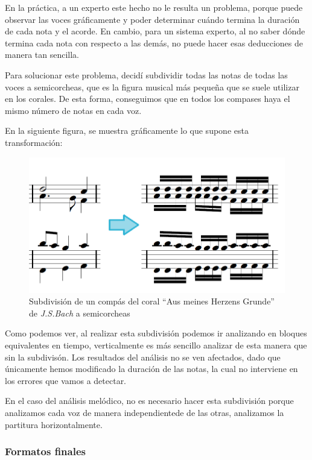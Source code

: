 En la práctica, a un experto este hecho no le resulta un problema, porque puede observar las voces gráficamente y poder determinar cuándo termina la duración de cada nota y el acorde. En cambio, para un sistema experto, al no saber dónde termina cada nota con respecto a las demás, no puede hacer esas deducciones de manera tan sencilla. 

Para solucionar este problema, decidí subdividir todas las notas de todas las voces a semicorcheas, que es la figura musical más pequeña que se suele utilizar en los corales. De esta forma, conseguimos que en todos los compases haya el mismo número de notas en cada voz.

En la siguiente figura, se muestra gráficamente lo que supone esta transformación:


\begin{figure}[H]
	\centering
	\includegraphics[scale=0.5]{imagenes/division.png}
	\caption{Subdivisión de un compás del coral ``Aus meines Herzens Grunde'' de \textit{J.S.Bach} a semicorcheas}
	\label{fig5.1.1}
\end{figure}

Como podemos ver, al realizar esta subdivisión podemos ir analizando en bloques equivalentes en tiempo, verticalmente es más sencillo analizar de esta manera que sin la subdivisón. Los resultados del análisis no se ven afectados, dado que únicamente hemos modificado la duración de las notas, la cual no interviene en los errores que vamos a detectar.

En el caso del análisis melódico, no es necesario hacer esta subdivisión porque analizamos cada voz de manera independientede de las otras, analizamos la partitura horizontalmente.

\subsubsection{Formatos finales}

